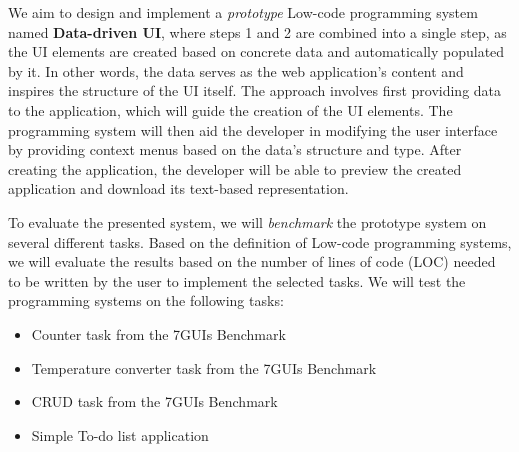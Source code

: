 We aim to design and implement a \emph{prototype} Low-code programming system named \textbf{Data-driven UI}, where steps 1 and 2 are combined into a single step, as the UI elements are created based on concrete data and automatically populated by it.
In other words, the data serves as the web application's content and inspires the structure of the UI itself.
The approach involves first providing data to the application, which will guide the creation of the UI elements.
The programming system will then aid the developer in modifying the user interface by providing context menus based on the data's structure and type.
After creating the application, the developer will be able to preview the created application and download its text-based representation.

To evaluate the presented system, we will \emph{benchmark} the prototype system on several different tasks.
Based on the definition of Low-code programming systems, we will evaluate the results based on the number of lines of code (LOC) needed to be written by the user to implement the selected tasks.
We will test the programming systems on the following tasks:
\begin{itemize}
	\item Counter task from the 7GUIs Benchmark
	\item Temperature converter task from the 7GUIs Benchmark
	\item CRUD task from the 7GUIs Benchmark
	\item Simple To-do list application
\end{itemize}



\newpage
